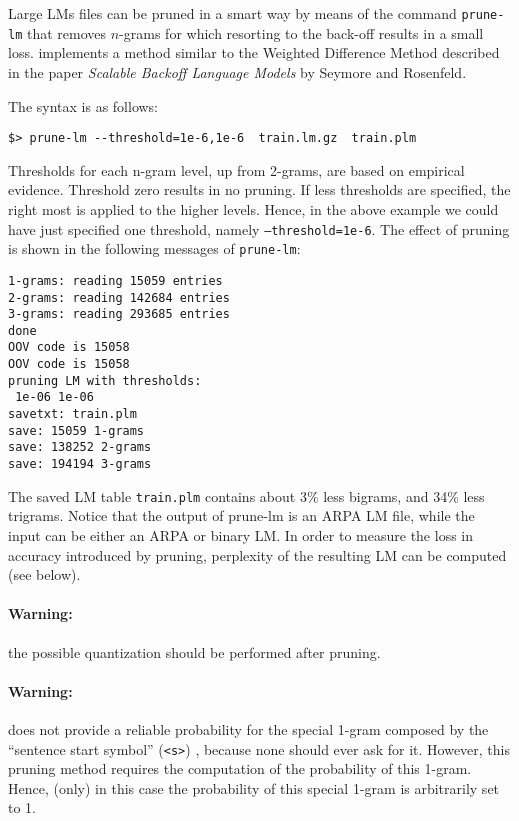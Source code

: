 Large LMs files can be pruned in a smart way by means of the command 
{\tt prune-lm} that removes $n$-grams for which resorting to the back-off 
results in a small loss. {\IRSTLM} implements a method similar to the 
Weighted Difference Method described in the paper {\em Scalable Backoff
Language Models} by Seymore and Rosenfeld.

\noindent
The syntax is as follows:
\begin{verbatim}
$> prune-lm --threshold=1e-6,1e-6  train.lm.gz  train.plm
\end{verbatim}
Thresholds for each n-gram level, up from 2-grams, are based on empirical 
evidence. Threshold zero results in no pruning. If less thresholds are specified,
the right most is applied to the higher levels. Hence, in the above example we
could have just specified one threshold, namely {\tt --threshold=1e-6}. 
The effect of pruning is shown in the following messages of {\tt prune-lm}:

\begin{verbatim}1-grams: reading 15059 entries
2-grams: reading 142684 entries
3-grams: reading 293685 entries
done
OOV code is 15058
OOV code is 15058
pruning LM with thresholds: 
 1e-06 1e-06
savetxt: train.plm
save: 15059 1-grams
save: 138252 2-grams
save: 194194 3-grams
\end{verbatim}

\noindent
The saved LM table {\tt train.plm}  contains about 3\% less bigrams, and 34\%  
less trigrams.
Notice that the output of prune-lm is an ARPA LM file, while the input can be 
either an ARPA or binary LM. 
In order to measure the loss in accuracy introduced
by pruning, perplexity of the resulting LM can be computed (see below).

\paragraph{Warning:} the possible quantization should be performed after pruning.

\paragraph{Warning:} 
{\IRSTLM} does not provide a reliable probability for the special
1-gram composed by the ``sentence start symbol'' ({\tt <s>}) , because none
should ever ask for it.  However, this pruning method requires the
computation of the probability of this 1-gram.  Hence, (only) in this case
the probability of this special 1-gram is arbitrarily set to 1.
